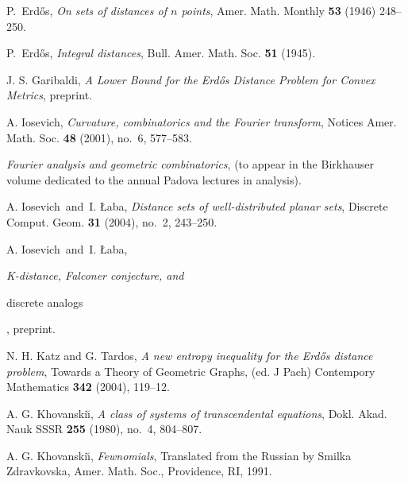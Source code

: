\documentclass[]{amsart}
\numberwithin{equation}{section}
\theoremstyle{plain}
\theoremstyle{definition}
\theoremstyle{remark}
\begin{document}
\begin{thebibliography}{55}
 P.~Erd\H{o}s,
{\it On sets of distances of $n$ points},
Amer. Math. Monthly {\bf 53}  (1946) 248--250.

 P.~Erd\H{o}s,
{\it Integral distances},  Bull. Amer. Math. Soc.
{\bf 51}  (1945).

 J. S. Garibaldi, {\it A Lower Bound
for the Erd\H{o}s Distance Problem for Convex Metrics},
preprint.

 A. Iosevich, {\it Curvature, combinatorics
and the Fourier transform}, Notices Amer. Math. Soc.
{\bf 48} (2001), no.~6, 577--583.

{\it Fourier analysis and geometric combinatorics}, (to appear in
the Birkhauser volume dedicated to the annual Padova lectures in
analysis).

  A. Iosevich\ and\ I. \L aba,
{\it Distance sets of well-distributed planar sets},
Discrete Comput. Geom. {\bf 31} (2004), no.~2, 243--250.


 A. Iosevich\ and\ I. \L aba,
{\it K-distance, Falconer conjecture, and

discrete analogs}, preprint.


 N. H. Katz and G. Tardos, {\it A new entropy inequality for the Erd\H{o}s distance problem}, Towards a Theory of Geometric Graphs,  (ed. J Pach) Contempory Mathematics {\bf 342} (2004), 119--12.

 A. G. Khovanski\u\i, {\it A class of systems of transcendental equations}, Dokl. Akad. Nauk SSSR {\bf 255} (1980), no.~4, 804--807.

 A. G. Khovanski\u\i, {\it Fewnomials}, Translated from the Russian by Smilka Zdravkovska,
Amer. Math. Soc., Providence, RI, 1991.


%




%


\end{thebibliography}
\end{document}
